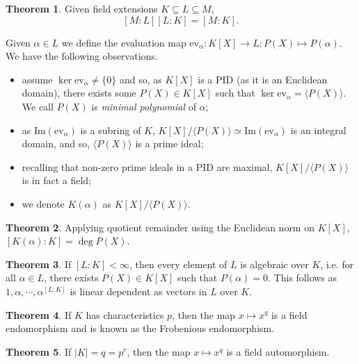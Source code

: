 \documentclass[]{article}
\theoremstyle{definition}
\newtheorem*{theorem}{Theorem}
\begin{document}
\begin{theorem}
  Given field extensions \(K \subseteq L \subseteq M\), 
  \[[M : L][L : K] = [M : K].\]
\end{theorem}

Given \(\alpha \in L\) we define the evaluation map \(\text{ev}_\alpha : K[X] \to L : P(X) \mapsto P(\alpha)\).
We have the following observations.
\begin{itemize}
  \item assume \(\ker \text{ev}_\alpha \neq \{0\}\) and so, as \(K[X]\) is a PID (as it is an Euclidean domain), 
    there exists some \(P(X) \in K[X]\) such that \(\ker \text{ev}_\alpha = \langle P(X) \rangle\). We call 
    \(P(X)\) is \textit{minimal polynomial} of \(\alpha\);
  \item as \(\text{Im}(\text{ev}_\alpha)\) is a subring of \(K\), \(K[X] / \langle P(X) \rangle \simeq \text{Im}(\text{ev}_\alpha)\)
    is an integral domain, and so, \(\langle P(X) \rangle\) is a prime ideal;
  \item recalling that non-zero prime ideals in a PID are maximal, \(K[X] / \langle P(X) \rangle\) 
    is in fact a field;
  \item we denote \(K(\alpha)\) as \(K[X] / \langle P(X) \rangle\).
\end{itemize}

\begin{theorem}
  Applying quotient remainder using the Euclidean norm on \(K[X]\), 
  \([K(\alpha) : K] = \deg P(X)\).
\end{theorem}

\begin{theorem}
  If \([L : K] < \infty\), then every element of \(L\) is algebraic over \(K\), 
  i.e. for all \(\alpha \in L\), there exists \(P(X) \in K[X]\) such that \(P(\alpha) = 0\).
  This follows as \(1, \alpha, \cdots, \alpha^{[L : K]}\) is linear dependent as vectors 
  in \(L\) over \(K\).
\end{theorem}

\begin{theorem}
  If \(K\) has characteristics \(p\), then the map \(x \mapsto x^q\) is a field endomorphism 
  and is known as the Frobenious endomorphism.
\end{theorem}

\begin{theorem}
  If \(|K| = q = p^r\), then the map \(x \mapsto x^q\) is a field automorphism.
\end{theorem}
\end{document}
